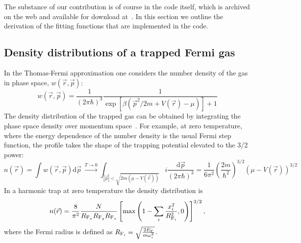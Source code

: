 The substance of our contribution is of course in the code itself, which is
archived on the web and available for download at~\cite{PedroMDuarte:11760}.  In this
section we outline the derivation of the fitting functions that are implemented
in the code.  


\subsection{Density distributions of a trapped Fermi gas}

In the Thomas-Fermi approximation one considers the number density of the gas
in phase space, $w(\vec{r},\vec{p})$:
\begin{equation}
w(\vec{r},\vec{p}) = 
    \frac{1}{(2\pi\hbar)^{3}} 
    \frac{1}{\exp\left[\beta(\vec{p}^{2}/2m + V(\vec{r}) - \mu) \right] + 1 }  
\end{equation}
The density distribution of the trapped gas can be obtained by integrating the
phase space density over momentum space~\cite{Butts1997}.  For example, at
zero temperature, where the energy dependence of the number density is the
usual Fermi step function,  the profile takes the shape of the trapping
potential elevated to the 3/2 power:
\begin{equation}
  n(\vec{r}) = \int w(\vec{r},\vec{p})\mathrm{d} \vec{p}~
    \overset{T\to 0 }{\longrightarrow}  
    \int_{| \vec{p}| < \sqrt{2m(\mu-V(\vec{r}))}} i
          \frac{\mathrm{d} \vec{p}}{(2\pi\hbar)^{3}} 
 = \frac{1}{6\pi^{2}} \left( \frac{2m}{\hbar^{2}} \right)^{3/2}
               (\mu - V(\vec{r}))^{3/2}
\end{equation}
In a harmonic trap at zero temperature the density distribution is
\begin{equation}
n(\vec{r}) = \frac{8}{\pi^{2}} 
             \frac{N}{ R_{\mathrm{F}_{x} }   R_{\mathrm{F}_{y} }   R_{\mathrm{F}_{z} } } 
\left[ \max\left( 1 - \sum_{i} \frac{x_{i}^{2}}{ R_{\mathrm{F}_{i} } ^{2}} , 0 \right) \right]^{3/2} ,
\end{equation}
where the Fermi radius is defined as $ R_{\mathrm{F}_{i} }  = \sqrt{\frac{ 2 E_{\mathrm{F}}}{m
\omega_{i}^{2}}}$. 


